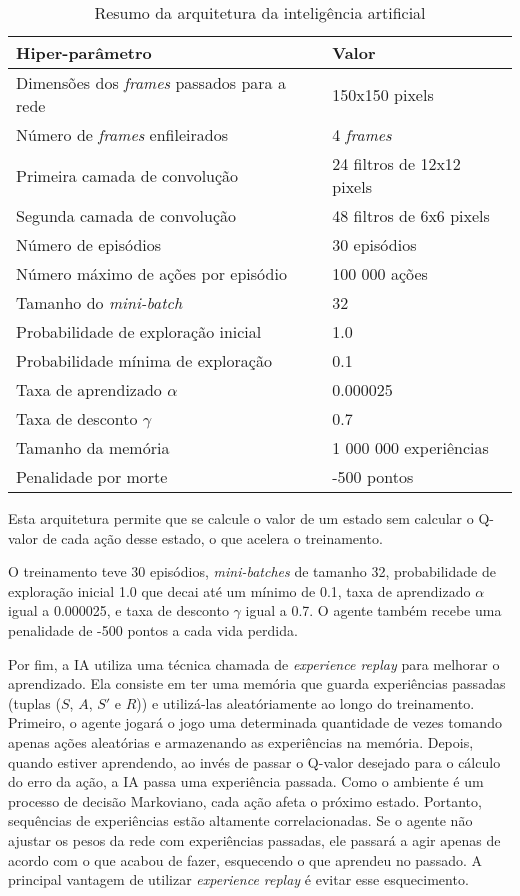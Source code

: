 \begin{table}
\centering
\begin{tabular}{| p{7cm} | p{7cm} |}
  \hline
  \textbf{Hiper-parâmetro} & \textbf{Valor} \\ \hline
  Dimensões dos \textit{frames} passados para a rede & 150x150 pixels \\ \hline
  Número de \textit{frames} enfileirados & 4 \textit{frames} \\ \hline
  Primeira camada de convolução & 24 filtros de 12x12 pixels \\ \hline
  Segunda camada de convolução & 48 filtros de 6x6 pixels \\ \hline
  Número de episódios & 30 episódios \\ \hline
  Número máximo de ações por episódio & 100 000 ações \\ \hline
  Tamanho do \textit{mini-batch} & 32 \\ \hline
  Probabilidade de exploração inicial & 1.0 \\ \hline
  Probabilidade mínima de exploração & 0.1 \\ \hline
  Taxa de aprendizado $\alpha$ & 0.000025 \\ \hline
  Taxa de desconto $\gamma$ & 0.7 \\ \hline
  Tamanho da memória & 1 000 000 experiências \\ \hline
  Penalidade por morte & -500 pontos \\ \hline
\end{tabular}
\caption{Resumo da arquitetura da inteligência artificial}
\label{table:2}
\end{table}

Esta arquitetura permite que se calcule o valor de um estado sem calcular o Q-valor de cada ação desse estado, o que acelera o treinamento.

O treinamento teve 30 episódios, \textit{mini-batches} de tamanho 32, probabilidade de exploração inicial 1.0 que decai até um mínimo de 0.1, taxa de aprendizado $\alpha$ igual a 0.000025, e taxa de desconto $\gamma$ igual a 0.7. O agente também recebe uma penalidade de -500 pontos a cada vida perdida.

Por fim, a IA utiliza uma técnica chamada de \textit{experience replay} para melhorar o aprendizado. Ela consiste em ter uma memória que guarda experiências passadas (tuplas ($S$, $A$, $S'$ e $R$)) e utilizá-las aleatóriamente ao longo do treinamento.
Primeiro, o agente jogará o jogo uma determinada quantidade de vezes tomando apenas ações aleatórias e armazenando as experiências na memória.
Depois, quando estiver aprendendo, ao invés de passar o Q-valor desejado para o cálculo do erro da ação, a IA passa uma experiência passada.
Como o ambiente é um processo de decisão Markoviano, cada ação afeta o próximo estado. Portanto, sequências de experiências estão altamente correlacionadas. Se o agente não ajustar os pesos da rede com experiências passadas, ele passará a agir apenas de acordo com o que acabou de fazer, esquecendo o que aprendeu no passado.
A principal vantagem de utilizar \textit{experience replay} é evitar esse esquecimento.

